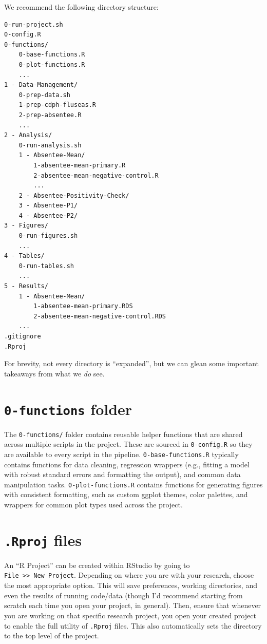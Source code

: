 \documentclass[
]{book}
\begin{document}
We recommend the following directory structure:

\begin{verbatim}
0-run-project.sh
0-config.R
0-functions/
    0-base-functions.R
    0-plot-functions.R
    ...
1 - Data-Management/
    0-prep-data.sh
    1-prep-cdph-fluseas.R
    2-prep-absentee.R
    ...
2 - Analysis/
    0-run-analysis.sh
    1 - Absentee-Mean/
        1-absentee-mean-primary.R
        2-absentee-mean-negative-control.R
        ...
    2 - Absentee-Positivity-Check/
    3 - Absentee-P1/
    4 - Absentee-P2/
3 - Figures/
    0-run-figures.sh
    ...
4 - Tables/
    0-run-tables.sh
    ...
5 - Results/
    1 - Absentee-Mean/
        1-absentee-mean-primary.RDS
        2-absentee-mean-negative-control.RDS
    ...
.gitignore
.Rproj
\end{verbatim}

For brevity, not every directory is ``expanded'', but we can glean some important takeaways from what we \emph{do} see.

\section{\texorpdfstring{\texttt{0-functions} folder}{0-functions folder}}\label{functions-folder}

The \texttt{0-functions/} folder contains reusable helper functions that are shared across multiple scripts in the project. These are sourced in \texttt{0-config.R} so they are available to every script in the pipeline. \texttt{0-base-functions.R} typically contains functions for data cleaning, regression wrappers (e.g., fitting a model with robust standard errors and formatting the output), and common data manipulation tasks. \texttt{0-plot-functions.R} contains functions for generating figures with consistent formatting, such as custom ggplot themes, color palettes, and wrappers for common plot types used across the project.

\section{\texorpdfstring{\texttt{.Rproj} files}{.Rproj files}}\label{rproj-files}

An ``R Project'' can be created within RStudio by going to \texttt{File\ \textgreater{}\textgreater{}\ New\ Project}. Depending on where you are with your research, choose the most appropriate option. This will save preferences, working directories, and even the results of running code/data (though I'd recommend starting from scratch each time you open your project, in general). Then, ensure that whenever you are working on that specific research project, you open your created project to enable the full utility of \texttt{.Rproj} files. This also automatically sets the directory to the top level of the project.
\end{document}
